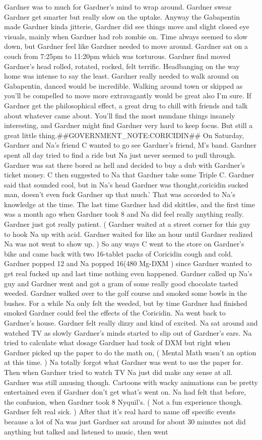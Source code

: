 \documentclass[12pt]{book}
\begin{document}
Gardner was to much for Gardner's mind to wrap around. Gardner swear Gardner get smarter but really slow on the uptake. Anyway the Gabapentin made Gardner kinda jitterie, Gardner did see things move and slight closed eye visuals, mainly when Gardner had rob zombie on. Time always seemed to slow down, but Gardner feel like Gardner needed to move around. Gardner sat on a couch from 7:25pm to 11:20pm which was torturous. Gardner find moved Gardner's head rolled, rotated, rocked, felt terrific. Headbanging on the way home was intense to say the least. Gardner really needed to walk around on Gabapentin, danced would be incredible. Walking around town or skipped as you'll be compelled to move more extravagantly would be great also I'm sure. If Gardner get the philosophical effect, a great drug to chill with friends and talk about whatever came about. You'll find the most mundane things insanely interesting, and Gardner might find Gardner very hard to keep focus. But still a great little thing.\#\#GOVERNMENT\_NOTE:CORICIDIN\#\# On Saturday, Gardner and Na's friend C wanted to go see Gardner's friend, M's band. Gardner spent all day tried to find a ride but Na just never seemed to pull through. Gardner was sat there bored as hell and decided to buy a dub with Gardner's ticket money. C then suggested to Na that Gardner take some Triple C. Gardner said that sounded cool, but in Na's head Gardner was thought,coricidin sucked man, doesn't even fuck Gardner up that much.' That was accorded to Na's knowledge at the time. The last time Gardner had did skittles, and the first time was a month ago when Gardner took 8 and Na did feel really anything really. Gardner just got really patient. ( Gardner waited at a street corner for this guy to hook Na up with acid. Gardner waited for like an hour until Gardner realized Na was not went to show up. ) So any ways C went to the store on Gardner's bike and came back with two 16-tablet packs of Coricidin cough and cold. Gardner popped 12 and Na popped 16(480 Mg-DXM ) since Gardner wanted to get real fucked up and last time nothing even happened. Gardner called up Na's guy and Gardner went and got a gram of some really good chocolate tasted weeded. Gardner walked over to the golf course and smoked some bowls in the bushes. For a while Na only felt the weeded, but by time Gardner had finished smoked Gardner could feel the effects of the Coricidin. Na went back to Gardner's house. Gardner felt really dizzy and kind of excited. Na sat around and watched TV as slowly Gardner's minds started to slip out of Gardner's ears. Na tried to calculate what dosage Gardner had took of DXM but right when Gardner picked up the paper to do the math on, ( Mental Math wasn't an option at this time. ) Na totally forgot what Gardner was went to use the paper for. Then when Gardner tried to watch TV Na just did make any sense at all. Gardner was still amusing though. Cartoons with wacky animations can be pretty entertained even if Gardner don't get what's went on. Na had felt that before, the confusion, when Gardner took 8 Nyquil's. ( Not a fun experience though. Gardner felt real sick. ) After that it's real hard to name off specific events because a lot of Na was just Gardner sat around for about 30 minutes not did anything but talked and listened to music, then went 
\end{document}
